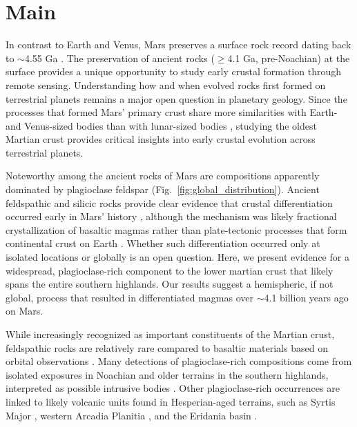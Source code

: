 \documentclass[11pt]{article}
\begin{document}
\section*{Main}

In contrast to Earth and Venus, Mars preserves a surface rock record dating back to $\sim$4.55 Ga \citep{Humayun2013, Kruijer2020}. The preservation of ancient rocks ($\geq$4.1 Ga, pre-Noachian) at the surface provides a unique opportunity to study early crustal formation through remote sensing. Understanding how and when evolved rocks first formed on terrestrial planets remains a major open question in planetary geology. Since the processes that formed Mars' primary crust share more similarities with Earth- and Venus-sized bodies than with lunar-sized bodies \citep{Elkins-Tanton2012}, studying the oldest Martian crust provides critical insights into early crustal evolution across terrestrial planets.

Noteworthy among the ancient rocks of Mars are compositions apparently dominated by plagioclase feldspar (Fig.~\ref{fig:global_distribution}). Ancient feldspathic and silicic rocks provide clear evidence that crustal differentiation occurred early in Mars' history \citep[e.g.,][]{Stolper2013, Sautter2015}, although the mechanism was likely fractional crystallization of basaltic magmas rather than plate-tectonic processes that form continental crust on Earth \citep{Udry2018}. Whether such differentiation occurred only at isolated locations or globally is an open question. Here, we present evidence for a widespread, plagioclase-rich component to the lower martian crust that likely spans the entire southern highlands. Our results suggest a hemispheric, if not global, process that resulted in differentiated magmas over $\sim$4.1 billion years ago on Mars.

While increasingly recognized as important constituents of the Martian crust, feldspathic rocks are relatively rare compared to basaltic materials based on orbital observations \citep{McSween2009, McSween2015, McSween2023}. Many detections of plagioclase-rich compositions come from isolated exposures in Noachian and older terrains in the southern highlands, interpreted as possible intrusive bodies \citep{Quantin2012, Carter2013, Wray2013, Sautter2016, Payre2022}. Other plagioclase-rich occurrences are linked to likely volcanic units found in Hesperian-aged terrains, such as Syrtis Major \citep{Eggers2021}, western Arcadia Planitia \citep{Farrand2021, Rogers2022}, and the Eridania basin \citep{Michalski2023}.
\end{document}
